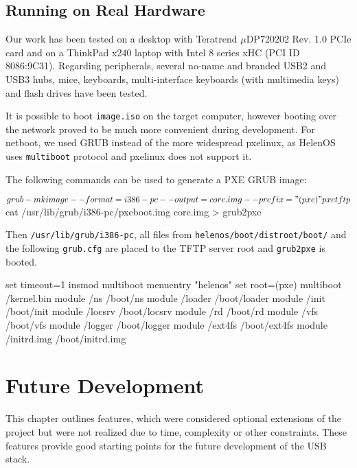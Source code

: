 \subsection{Running on Real Hardware}

Our work has been tested on a desktop with Teratrend $\mu$DP720202 Rev. 1.0
PCIe card and on a ThinkPad x240 laptop with Intel 8 series xHC (PCI ID
8086:9C31).  Regarding peripherals, several no-name and branded USB2 and USB3
hubs, mice, keyboards, multi-interface keyboards (with multimedia keys) and
flash drives have been tested.

It is possible to boot \texttt{image.iso} on the target computer, however
booting over the network proved to be much more convenient during development.
For netboot, we used GRUB instead of the more widespread pxelinux, as HelenOS
uses \texttt{multiboot} protocol and pxelinux does not support it.

The following commands can be used to generate a PXE GRUB image:

\begin{bdsh}
$ grub-mkimage --format=i386-pc --output=core.img --prefix="(pxe)" pxe tftp
$ cat /usr/lib/grub/i386-pc/pxeboot.img core.img > grub2pxe
\end{bdsh}

Then \texttt{/usr/lib/grub/i386-pc}, all files from
\texttt{helenos/boot/distroot/boot/} and the following \texttt{grub.cfg} are
placed to the TFTP server root and \texttt{grub2pxe} is booted.

\begin{bdsh}
set timeout=1
insmod multiboot
menuentry "helenos" {
  set root=(pxe)
  multiboot /kernel.bin
  module    /ns /boot/ns
  module    /loader /boot/loader
  module    /init /boot/init
  module    /locsrv /boot/locsrv
  module    /rd /boot/rd
  module    /vfs /boot/vfs
  module    /logger /boot/logger
  module    /ext4fs /boot/ext4fs
  module    /initrd.img /boot/initrd.img
}
\end{bdsh}

\section{Future Development}

This chapter outlines features, which were considered optional extensions of
the project but were not realized due to time, complexity or other constraints.
These features provide good starting points for the future development of the
USB stack.

